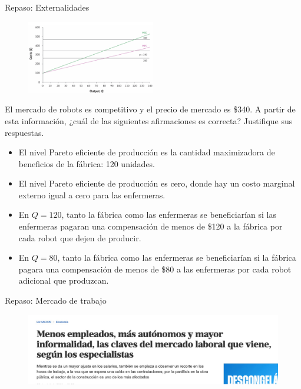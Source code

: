 \documentclass{beamer}
\begin{document}
\begin{frame}{Repaso: Externalidades}
    \scriptsize

    \begin{figure}[h!]
        \centering
        \includegraphics[width=0.5\textwidth]{../Figures/Externalidades_Ejercicio.png}
    \end{figure}

    El mercado de robots es competitivo y el precio de mercado es \$340. A partir de esta información, ¿cuál de las siguientes afirmaciones es correcta? Justifique sus respuestas.
    \begin{itemize}
        \item El nivel Pareto eficiente de producción es la cantidad maximizadora de beneficios de la fábrica: 120 unidades.
        \item El nivel Pareto eficiente de producción es cero, donde hay un costo marginal externo igual a cero para las enfermeras. 
        \item En \(Q = 120\), tanto la fábrica como las enfermeras se beneficiarían si las enfermeras pagaran una compensación de menos de \$120 a la fábrica por cada robot que dejen de producir.
        \item En \(Q = 80\), tanto la fábrica como las enfermeras se beneficiarían si la fábrica pagara una compensación de menos de \$80 a las enfermeras por cada robot adicional que produzcan.
    \end{itemize}

\end{frame}

\begin{frame}{Repaso: Mercado de trabajo}

    \begin{figure}[h!]
        \centering
        \includegraphics[width=1\textwidth]{../Figures/ejercicio_noticia0.jpg}
    \end{figure}

\end{frame}
\end{document}
